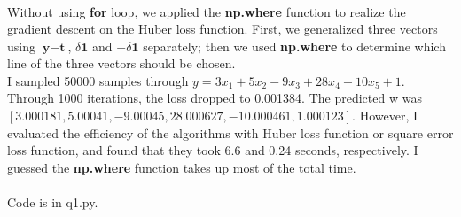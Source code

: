 \documentclass{myhw}
\begin{document}
\begin{homeworkProblem}
\begin{homeworkSection}
\begin{gather*}
\end{gather*}
Without using \textbf{for} loop, we applied the \textbf{np.where} function to realize the gradient descent on the Huber loss function. 
First, we generalized three vectors using $\textbf{y}-\textbf{t}$, $\delta \textbf{1}$ and $-\delta \textbf{1}$ separately; 
then we used \textbf{np.where} to determine which line of the three vectors should be chosen.
\\
I sampled 50000 samples through $y=3x_1 + 5x_2 - 9x_3 + 28x_4 -10x_5 + 1$. Through 1000 iterations, the loss dropped to 0.001384. The predicted w was $[3.000181, 5.00041, -9.00045, 28.000627, -10.000461, 1.000123]$. However, I evaluated the efficiency of the algorithms with Huber loss function or square error loss function, and found that they took 6.6 and 0.24 seconds, respectively. I guessed the \textbf{np.where} function takes up most of the total time.
\\
\\
Code is in q1.py.
\end{homeworkSection}
\end{homeworkProblem}
\end{document}

